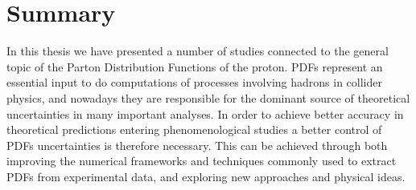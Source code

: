 \chapter{Summary}
\label{ch:conclusions}
In this thesis we have presented a number of studies connected to the general topic of the Parton Distribution Functions
of the proton.
PDFs represent an essential input to do computations of processes involving hadrons in collider physics, and nowadays
they are responsible for the dominant source of theoretical uncertainties in many important analyses.
In order to achieve better accuracy in theoretical predictions entering phenomenological studies 
a better control of PDFs uncertainties is therefore necessary. This can be achieved through both
improving the numerical frameworks and techniques commonly used to extract PDFs from experimental data, 
and exploring new approaches and physical ideas. 